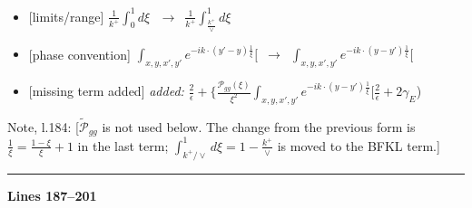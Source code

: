 \documentclass[10pt]{article}
\newenvironment{notebox}{\def\FrameCommand{{\color{notebar}\vrule width 1.5pt}\hspace{6pt}}\MakeFramed{\advance\hsize-\width\FrameRestore}\small}{\endMakeFramed}
\begin{document}
\begin{itemize}[leftmargin=2.2em,itemsep=1pt,topsep=2pt]
\item[\textbf{l.180}] \textsf{\small [limits/range]} $\displaystyle \frac{1}{k^{+}}\int_{0}^{1}d\xi\,$\ $\longrightarrow$\ $\displaystyle \frac{1}{k^{+}}\int_{\frac{k^{+}}{\vee}}^{1}d\xi\,$
\item[\textbf{l.180}] \textsf{\small [phase convention]} $\displaystyle \int_{x,y,x',y'}e^{-ik\cdot(y'-y)\frac{1}{\xi}}\Big[$\ $\longrightarrow$\ $\displaystyle \int_{x,y,x',y'}e^{-ik\cdot(y-y')\frac{1}{\xi}}\Big[$
\item[\textbf{l.180}] \textsf{\small [missing term added]} \emph{added:} $\displaystyle \frac{2}{\epsilon}+$$\displaystyle \{\frac{\mathcal P_{gg}(\xi)}{\xi^{2}}\int_{x,y,x',y'}e^{-ik\cdot(y-y')\frac{1}{\xi}}\Big[\frac{2}{\epsilon}+2\gamma_{E}${\color{gray}\small)}
\end{itemize}
\begin{notebox}\textsf{\small Note, l.184:} [$\widetilde{\mathcal{P}}_{gg}$ is not used below. The change from the previous form is $\frac{1}{\xi}=\frac{1-\xi}{\xi}+1$ in the last term; $\int_{k^{+}/\vee}^{1}d\xi=1-\frac{k^{+}}{\vee}$ is moved to the BFKL term.]\end{notebox}
\noindent\rule{\linewidth}{0.3pt}\par\noindent\textbf{Lines 187--201} \par
\end{document}

